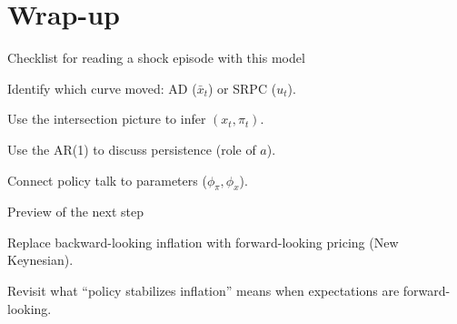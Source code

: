 \documentclass[aspectratio=169,xcolor=dvipsnames]{beamer}
\let\tempone\itemize
\let\temptwo\enditemize
\renewenvironment{itemize}{\tempone\addtolength{\itemsep}{\fill}}{\temptwo}
\let\tempa\enumerate
\let\tempb\endenumerate
\renewenvironment{enumerate}{\tempa\addtolength{\itemsep}{\fill}}{\tempb}
\begin{document}
\section{Wrap-up}

\begin{frame}{Checklist for reading a shock episode with this model}
\begin{enumerate}
\item Identify which curve moved: AD ($\bar x_t$) or SRPC ($u_t$).
\item Use the intersection picture to infer $(x_t,\pi_t)$.
\item Use the AR(1) to discuss persistence (role of $a$).
\item Connect policy talk to parameters ($\phi_\pi,\phi_x$).
\end{enumerate}
\end{frame}

\begin{frame}{Preview of the next step}
\begin{itemize}
\item Replace backward-looking inflation with forward-looking pricing (New Keynesian).
\item Revisit what ``policy stabilizes inflation'' means when expectations are forward-looking.
\end{itemize}
\end{frame}
\end{document}

